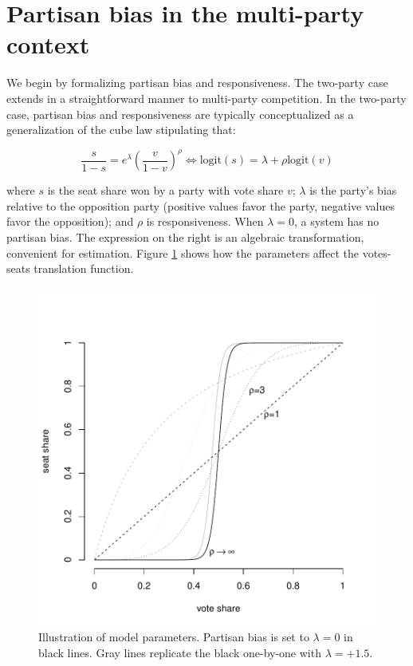 \documentclass[letter,12pt]{article}
\begin{document}
\section{Partisan bias in the multi-party context}\label{S:bias}

We begin by formalizing partisan bias and responsiveness. The two-party case \citep{taagepera.CubeLaw.1973,tufte1973seatsVotes,king.browning1987biasRespUS} extends in a straightforward manner to multi-party competition. In the two-party case, partisan bias and responsiveness are typically conceptualized as a generalization of the cube law stipulating that:

\begin{equation}\label{E:kingBi}
 \frac{s}{1-s} = e^\lambda  \left(\frac{v}{1-v}\right)^\rho \iff
 \text{logit}(s) = \lambda + \rho  \text{logit}(v)
\end{equation}\label{E:cubeLaw}

\noindent where $s$ is the seat share won by a party with vote share $v$; $\lambda$ is the party's bias relative to the opposition party (positive values favor the party, negative values favor the opposition); and $\rho$ is responsiveness. When $\lambda=0$, a system has no partisan bias. The expression on the right is an algebraic transformation, convenient for estimation. Figure \ref{F:lambdaRhoEx} shows how the parameters affect the votes-seats translation function. 


\begin{figure}
\begin{center}
    \includegraphics[width=.55\columnwidth]{rhoExample.pdf} 
\caption{Illustration of model parameters. Partisan bias is set to $\lambda=0$ in black lines. Gray lines replicate the black one-by-one with $\lambda=+1.5$.}\label{F:lambdaRhoEx}
\end{center}
\end{figure}
\end{document}
